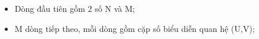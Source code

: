 \begin{itemize}
	\item     Dòng đầu tiên gồm 2 số N và M;   
	\item     M dòng tiếp theo, mỗi dòng gồm cặp số biểu diễn quan hệ (U,V);   
\end{itemize}